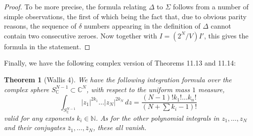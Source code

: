 \documentclass[12pt]{amsbook}
\newtheorem{theorem}{Theorem}[chapter]
\begin{document}
\begin{proof}
To be more precise, the formula relating $\Delta$ to $\Sigma$ follows from a number of simple observations, the first of which being the fact that, due to obvious parity reasons, the sequence of $\delta$ numbers appearing in the definition of $\Delta$ cannot contain two consecutive zeroes. Now together with $I=(2^N/V)I'$, this gives the formula in the statement.
\end{proof}

Finally, we have the following complex version of Theorems 11.13 and 11.14:


\begin{theorem}[Wallis 4]
We have the following integration formula over the complex sphere $S^{N-1}_\mathbb C\subset\mathbb C^N$, with respect to the uniform mass $1$ measure, 
$$\int_{S^{N-1}_\mathbb C}|z_1|^{2k_1}\ldots|z_N|^{2k_N}\,dz=\frac{(N-1)!k_1!\ldots k_n!}{(N+\sum k_i-1)!}$$
valid for any exponents $k_i\in\mathbb N$. As for the other polynomial integrals in $z_1,\ldots,z_N$ and their conjugates $\bar{z}_1,\ldots,\bar{z}_N$, these all vanish.
\end{theorem}
\end{document}
